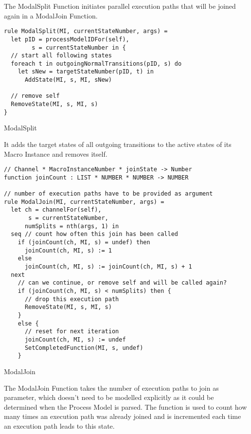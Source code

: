 The ModalSplit Function initiates parallel execution paths that will be joined again in a ModalJoin Function.


\begin{listing}[htbp]
\begin{verbatim}
rule ModalSplit(MI, currentStateNumber, args) =
  let pID = processModelIDFor(self),
        s = currentStateNumber in {
  // start all following states
  foreach t in outgoingNormalTransitions(pID, s) do
    let sNew = targetStateNumber(pID, t) in
      AddState(MI, s, MI, sNew)

  // remove self
  RemoveState(MI, s, MI, s)
}
\end{verbatim}
\caption{ModalSplit}
\label{lst:shortasm:ModalSplit}
\end{listing}


It adds the target states of all outgoing transitions to the active states of its Macro Instance and removes itself.



\begin{listing}[htbp]
\begin{verbatim}
// Channel * MacroInstanceNumber * joinState -> Number
function joinCount : LIST * NUMBER * NUMBER -> NUMBER

// number of execution paths have to be provided as argument
rule ModalJoin(MI, currentStateNumber, args) =
  let ch = channelFor(self),
       s = currentStateNumber,
      numSplits = nth(args, 1) in
  seq // count how often this join has been called
    if (joinCount(ch, MI, s) = undef) then
      joinCount(ch, MI, s) := 1
    else
      joinCount(ch, MI, s) := joinCount(ch, MI, s) + 1
  next
    // can we continue, or remove self and will be called again?
    if (joinCount(ch, MI, s) < numSplits) then {
      // drop this execution path
      RemoveState(MI, s, MI, s)
    }
    else {
      // reset for next iteration
      joinCount(ch, MI, s) := undef
      SetCompletedFunction(MI, s, undef)
    }
\end{verbatim}
\caption{ModalJoin}
\label{lst:shortasm:ModalJoin}
\end{listing}


The ModalJoin Function takes the number of execution paths to join as parameter, which doesn't need to be modelled explicitly as it could be determined when the Process Model is parsed. The  function is used to count how many times an execution path was already joined and is incremented each time an execution path leads to this state.

